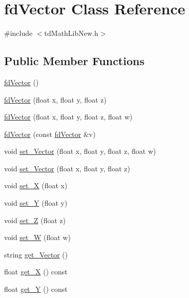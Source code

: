 \hypertarget{classfd_vector}{}\section{fd\+Vector Class Reference}
\label{classfd_vector}


{\ttfamily \#include $<$td\+Math\+Lib\+New.\+h$>$}

\subsection*{Public Member Functions}
\begin{DoxyCompactItemize}
\item 
\hyperlink{classfd_vector_ae193285f8bf5e0243f4cbdaca41f8e07}{fd\+Vector} ()
\item 
\hyperlink{classfd_vector_a1223fe25ab0e876d0bedf51a4c8d4ede}{fd\+Vector} (float x, float y, float z)
\item 
\hyperlink{classfd_vector_a8e96515d4ae35ed6c51f5e4c930c20a9}{fd\+Vector} (float x, float y, float z, float w)
\item 
\hyperlink{classfd_vector_a738c19c1aa5328b8a6f5c62abbc9b134}{fd\+Vector} (const \hyperlink{classfd_vector}{fd\+Vector} \&v)
\item 
void \hyperlink{classfd_vector_ae72b4bb9c74c1253854a222b34760ece}{set\+\_\+\+Vector} (float x, float y, float z, float w)
\item 
void \hyperlink{classfd_vector_abfb903efd118f8e79eefa6a3563e108f}{set\+\_\+\+Vector} (float x, float y, float z)
\item 
void \hyperlink{classfd_vector_a96a3763b89af618c024743dc9e681b12}{set\+\_\+X} (float x)
\item 
void \hyperlink{classfd_vector_a8002af4ee4ec47da912555488528679c}{set\+\_\+Y} (float y)
\item 
void \hyperlink{classfd_vector_a058f0e9306b534430b12fd692f6b0345}{set\+\_\+Z} (float z)
\item 
void \hyperlink{classfd_vector_a700e29b9a1e0a872bbb1c41480522962}{set\+\_\+W} (float w)
\item 
string \hyperlink{classfd_vector_adceaf088e11b897bcd45dbb405b50c71}{get\+\_\+\+Vector} ()
\item 
float \hyperlink{classfd_vector_ad1cd812db0a8076ec4fa135d12695e96}{get\+\_\+X} () const
\item 
float \hyperlink{classfd_vector_af0d8177ae244369991268b35afcbac9e}{get\+\_\+Y} () const
\item 

\end{DoxyCompactItemize}
